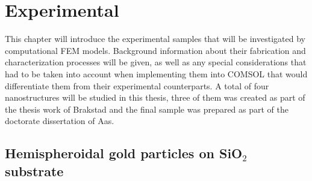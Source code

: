 
\chapter{Experimental} \label{chapter3}
This chapter will introduce the experimental samples that will be investigated by computational FEM models. Background information about their fabrication and characterization processes will be given, as well as any special considerations that had to be taken into account when implementing them into COMSOL that would differentiate them from their experimental counterparts. A total of four nanostructures will be studied in this thesis, three of them was created as part of the thesis work of Brakstad\cite{brakstad_thesis} and the final sample was prepared as part of the doctorate dissertation of Aas\cite{gasbcones}.



\section{Hemispheroidal gold particles on SiO$_2$ substrate}


